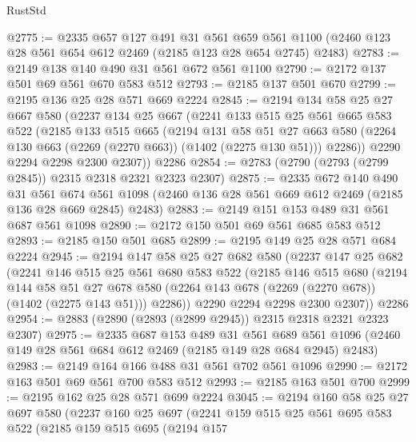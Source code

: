 \begin{lexlean}{RustStd}
\begin{coremodule}
@2775 := @2335
    @657
    @127
    @491
    @31
    @561
    @659
    @561
    @1100
    (@2460 @123 @28 @561 @654 @612 @2469 (@2185 @123 @28 @654 @2745) @2483)
@2783 := @2149 @138 @140 @490 @31 @561 @672 @561 @1100
@2790 := @2172 @137 @501 @69 @561 @670 @583 @512
@2793 := @2185 @137 @501 @670
@2799 := @2195 @136 @25 @28 @571 @669 @2224
@2845 := @2194
    @134
    @58
    @25
    @27
    @667
    @580
    (@2237
      @134
      @25
      @667
      (@2241
        @133
        @515
        @25
        @561
        @665
        @583
        @522
        (@2185
          @133
          @515
          @665
          (@2194
            @131
            @58
            @51
            @27
            @663
            @580
            (@2264 @130 @663 (@2269 (@2270 @663)) (@1402 (@2275 @130 @51)))
            @2286))
        @2290
        @2294
        @2298
        @2300
        @2307))
    @2286
@2854 := @2783 (@2790 (@2793 (@2799 @2845)) @2315 @2318 @2321 @2323 @2307)
@2875 := @2335
    @672
    @140
    @490
    @31
    @561
    @674
    @561
    @1098
    (@2460 @136 @28 @561 @669 @612 @2469 (@2185 @136 @28 @669 @2845) @2483)
@2883 := @2149 @151 @153 @489 @31 @561 @687 @561 @1098
@2890 := @2172 @150 @501 @69 @561 @685 @583 @512
@2893 := @2185 @150 @501 @685
@2899 := @2195 @149 @25 @28 @571 @684 @2224
@2945 := @2194
    @147
    @58
    @25
    @27
    @682
    @580
    (@2237
      @147
      @25
      @682
      (@2241
        @146
        @515
        @25
        @561
        @680
        @583
        @522
        (@2185
          @146
          @515
          @680
          (@2194
            @144
            @58
            @51
            @27
            @678
            @580
            (@2264 @143 @678 (@2269 (@2270 @678)) (@1402 (@2275 @143 @51)))
            @2286))
        @2290
        @2294
        @2298
        @2300
        @2307))
    @2286
@2954 := @2883 (@2890 (@2893 (@2899 @2945)) @2315 @2318 @2321 @2323 @2307)
@2975 := @2335
    @687
    @153
    @489
    @31
    @561
    @689
    @561
    @1096
    (@2460 @149 @28 @561 @684 @612 @2469 (@2185 @149 @28 @684 @2945) @2483)
@2983 := @2149 @164 @166 @488 @31 @561 @702 @561 @1096
@2990 := @2172 @163 @501 @69 @561 @700 @583 @512
@2993 := @2185 @163 @501 @700
@2999 := @2195 @162 @25 @28 @571 @699 @2224
@3045 := @2194
    @160
    @58
    @25
    @27
    @697
    @580
    (@2237
      @160
      @25
      @697
      (@2241
        @159
        @515
        @25
        @561
        @695
        @583
        @522
        (@2185
          @159
          @515
          @695
          (@2194
            @157

\end{coremodule}
\end{lexlean}
